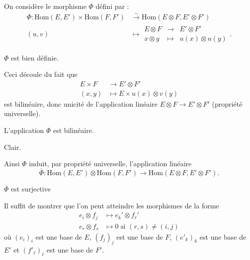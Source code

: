 \documentclass{../../notes}
\begin{document}
  \begin{prv}
    On considère le morphisme $\Phi$ défini par :
    \begin{align*}
      \Phi : \mathrm{Hom}(E, E') \times \mathrm{Hom}(F, F') &\overset \sim \longrightarrow  \mathrm{Hom}(E \otimes F, E' \otimes F')\\
      (u,v) &\longmapsto 
      \begin{array}{|rcl}
        E \otimes F &\to& E' \otimes F'\\
        x \otimes y &\mapsto & u(x) \otimes u(y)
      \end{array}
    .\end{align*}
    \begin{obs}
      $\Phi$ est bien définie.
    \end{obs}
    \begin{expl}
      Ceci découle du fait que \begin{align*}
        E \times F &\longrightarrow E' \otimes F' \\
        (x,y) &\longmapsto E \times u(x)\otimes v(y)
      \end{align*} est bilinéaire, donc unicité de l'application linéaire $E \otimes F \to E' \otimes F'$ (propriété universelle).
    \end{expl}

    \begin{obs}
      L'application $\Phi$ est bilinéaire.
    \end{obs}
    \begin{expl}
      Clair.
    \end{expl}

    Ainsi $\Phi$ induit, par propriété universelle, l'application linéaire  \[
    \bar{\Phi} : \mathrm{Hom}(E, E') \otimes \mathrm{Hom}(F, F') \to \mathrm{Hom}(E \otimes F, E' \otimes F')
    .\]

    \begin{obs}
      $\bar{\Phi}$ est surjective
    \end{obs}
    \begin{expl}
      Il suffit de montrer que l'on peut atteindre les morphismes de la forme
      \begin{align*}
        e_i \otimes f_j &\longmapsto e_k' \otimes f_\ell'\\
        e_r \otimes f_s &\longmapsto 0 \text{ si } (r,s) \neq (i,j)
      \end{align*}où $(e_i)_i$ est une base de  $E$, $(f_j)_j$ est une base de  $F$, $(e'_k)_k$ est une base de  $E'$ et $(f'_\ell)_\ell$ est une base de $F'$.


\end{expl}
\end{prv}
\end{document}
